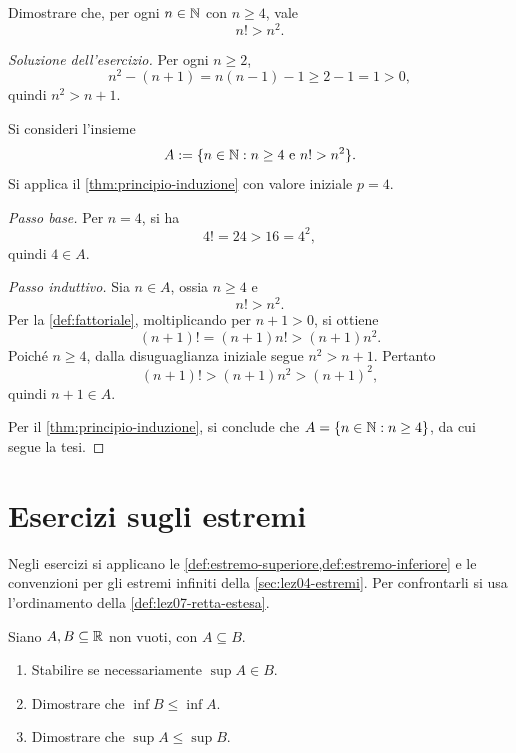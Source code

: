 \clearpage

\begin{exercise}
\label{ex:fattoriale-maggiore-n-quadro}
Dimostrare che, per ogni \(n\in\mathbb{N}\) con \(n\ge4\), vale
\[
  n!>n^2.
\]
\end{exercise}

\begin{proof}[Soluzione dell'esercizio]
Per ogni \(n\ge2\),
\[
  n^2-(n+1)=n(n-1)-1\ge2-1=1>0,
\]
quindi \(n^2>n+1\).

Si consideri l'insieme
\[
  A:=\{n\in\mathbb{N}:n\ge4\text{ e }n!>n^2\}.
\]
Si applica il \cref{thm:principio-induzione} con valore iniziale
\(p=4\).

\emph{Passo base.}
Per \(n=4\), si ha
\[
  4!=24>16=4^2,
\]
quindi \(4\in A\).

\emph{Passo induttivo.}
Sia \(n\in A\), ossia \(n\ge4\) e
\[
  n!>n^2.
\]
Per la \cref{def:fattoriale}, moltiplicando per \(n+1>0\),
si ottiene
\[
  (n+1)!=(n+1)n!>(n+1)n^2.
\]
Poiché \(n\ge4\), dalla disuguaglianza iniziale segue
\(n^2>n+1\). Pertanto
\[
  (n+1)!>(n+1)n^2>(n+1)^2,
\]
quindi \(n+1\in A\).

Per il \cref{thm:principio-induzione}, si conclude che
\(A=\{n\in\mathbb{N}:n\ge4\}\), da cui segue la tesi.
\end{proof}

\section{Esercizi sugli estremi}
\label{sec:lez05-esercizi-estremi}

Negli esercizi si applicano le
\cref{def:estremo-superiore,def:estremo-inferiore} e le
convenzioni per gli estremi infiniti della \cref{sec:lez04-estremi}.
Per confrontarli si usa l'ordinamento della
\cref{def:lez07-retta-estesa}.

\begin{exercise}
\label{ex:estremi-inclusione}
Siano \(A,B\subseteq\mathbb{R}\) non vuoti, con \(A\subseteq B\).
\begin{enumerate}
  \item Stabilire se necessariamente \(\sup A\in B\).
  \item Dimostrare che \(\inf B\le\inf A\).
  \item Dimostrare che \(\sup A\le\sup B\).
\end{enumerate}
\end{exercise}

